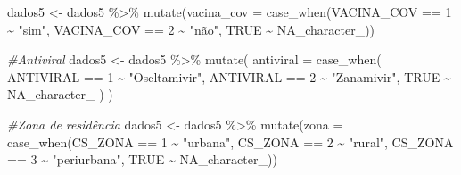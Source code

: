 \documentclass[
]{article}
\newenvironment{Shaded}{\begin{snugshade}}{\end{snugshade}}
\newcommand{\AttributeTok}[1]{\textcolor[rgb]{0.77,0.63,0.00}{#1}}
\newcommand{\CommentTok}[1]{\textcolor[rgb]{0.56,0.35,0.01}{\textit{#1}}}
\newcommand{\ConstantTok}[1]{\textcolor[rgb]{0.00,0.00,0.00}{#1}}
\newcommand{\DecValTok}[1]{\textcolor[rgb]{0.00,0.00,0.81}{#1}}
\newcommand{\FunctionTok}[1]{\textcolor[rgb]{0.00,0.00,0.00}{#1}}
\newcommand{\NormalTok}[1]{#1}
\newcommand{\OtherTok}[1]{\textcolor[rgb]{0.56,0.35,0.01}{#1}}
\newcommand{\SpecialCharTok}[1]{\textcolor[rgb]{0.00,0.00,0.00}{#1}}
\newcommand{\StringTok}[1]{\textcolor[rgb]{0.31,0.60,0.02}{#1}}
\begin{document}
\begin{Shaded}
\begin{Highlighting}[]
\NormalTok{dados5 }\OtherTok{\textless{}{-}}\NormalTok{  dados5 }\SpecialCharTok{\%\textgreater{}\%}
  \FunctionTok{mutate}\NormalTok{(}\AttributeTok{vacina\_cov =} \FunctionTok{case\_when}\NormalTok{(VACINA\_COV }\SpecialCharTok{==} \DecValTok{1} \SpecialCharTok{\textasciitilde{}} \StringTok{"sim"}\NormalTok{,}
\NormalTok{                            VACINA\_COV }\SpecialCharTok{==} \DecValTok{2} \SpecialCharTok{\textasciitilde{}} \StringTok{"não"}\NormalTok{,}
                            \ConstantTok{TRUE} \SpecialCharTok{\textasciitilde{}} \ConstantTok{NA\_character\_}\NormalTok{))}

\CommentTok{\#Antiviral}
\NormalTok{dados5 }\OtherTok{\textless{}{-}}\NormalTok{  dados5 }\SpecialCharTok{\%\textgreater{}\%}
  \FunctionTok{mutate}\NormalTok{(}
    \AttributeTok{antiviral =} \FunctionTok{case\_when}\NormalTok{(}
\NormalTok{      ANTIVIRAL }\SpecialCharTok{==} \DecValTok{1} \SpecialCharTok{\textasciitilde{}} \StringTok{"Oseltamivir"}\NormalTok{,}
\NormalTok{      ANTIVIRAL }\SpecialCharTok{==} \DecValTok{2} \SpecialCharTok{\textasciitilde{}} \StringTok{"Zanamivir"}\NormalTok{,}
      \ConstantTok{TRUE} \SpecialCharTok{\textasciitilde{}} \ConstantTok{NA\_character\_}
\NormalTok{    )}
\NormalTok{  )}

\CommentTok{\#Zona de residência}
\NormalTok{dados5 }\OtherTok{\textless{}{-}}\NormalTok{  dados5 }\SpecialCharTok{\%\textgreater{}\%}
  \FunctionTok{mutate}\NormalTok{(}\AttributeTok{zona =} \FunctionTok{case\_when}\NormalTok{(CS\_ZONA }\SpecialCharTok{==} \DecValTok{1} \SpecialCharTok{\textasciitilde{}} \StringTok{"urbana"}\NormalTok{,}
\NormalTok{                          CS\_ZONA }\SpecialCharTok{==} \DecValTok{2} \SpecialCharTok{\textasciitilde{}} \StringTok{"rural"}\NormalTok{,}
\NormalTok{                          CS\_ZONA }\SpecialCharTok{==} \DecValTok{3} \SpecialCharTok{\textasciitilde{}} \StringTok{"periurbana"}\NormalTok{,}
                                  \ConstantTok{TRUE} \SpecialCharTok{\textasciitilde{}} \ConstantTok{NA\_character\_}\NormalTok{))}



\end{Highlighting}
\end{Shaded}
\end{document}
